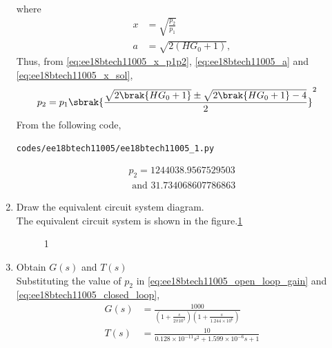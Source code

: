 \begin{enumerate}[label=\arabic*.,ref=\theenumi]
\begin{align}
\label{eq:ee18btech11005_x_sol}
\end{align}
%
where 
\begin{align}
\label{eq:ee18btech11005_x_p1p2}
x  &= \sqrt{\frac{p_2}{p_1}}
\\
a &= \sqrt{2(HG_0+1)}, 
\label{eq:ee18btech11005_a}
\end{align}
Thus, from \eqref{eq:ee18btech11005_x_p1p2}, \eqref{eq:ee18btech11005_a}
and \eqref{eq:ee18btech11005_x_sol},
%
\begin{align}
p_2 &= p_1\sbrak{\frac{\sqrt{2\brak{HG_0+1}} \pm \sqrt{2 \brak{HG_0+1}-4}}{2}}^2
\end{align}
%
From the following code,
\begin{lstlisting}
codes/ee18btech11005/ee18btech11005_1.py
\end{lstlisting}
%
\begin{multline}
p_2 = 1244038.9567529503 
\\
\text{ and } 31.734068607786863
\end{multline}
%
\item  Draw the equivalent circuit system diagram.\\
\solution
The equivalent circuit system is shown in the figure.\ref{fig:equivalent_system}
\begin{figure}[!hbt]
	\begin{center}
			\resizebox{\columnwidth}{!}{}
	\end{center}
\caption{1}
\label{fig:equivalent_system}
\end{figure}
\item Obtain $G(s)$ and $T(s)$
\\
\solution Substituting the value of $p_2$ in  \eqref{eq:ee18btech11005_open_loop_gain} and \eqref{eq:ee18btech11005_closed_loop},
\begin{align}
     G(s) &= \frac{1000}{(1+\frac{s}{2\pi10^3})(1+\frac{s}{1.244\times10^6})}
    \label{eq:ee18btech11005_G(s)}
\\
    T(s) &= \frac{10}{0.128\times10^{-11}s^2+1.599\times10^{-6}s+1}
    \label{eq:ee18btech11005_Transfer_func}
\end{align}


\end{enumerate}
